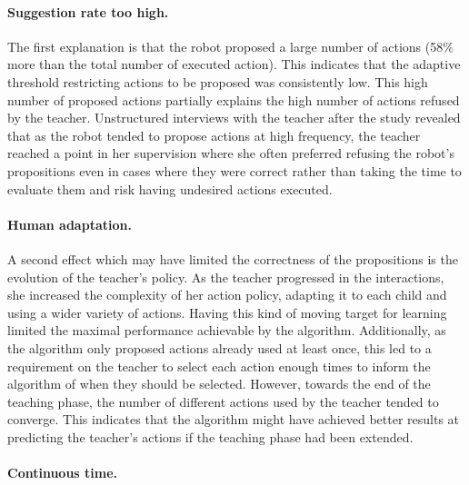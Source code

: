 \paragraph{Suggestion rate too high.}

The first explanation is that the robot proposed a large number of actions (58\% more than the total number of executed action). This indicates that the adaptive threshold restricting actions to be proposed was consistently low. This high number of proposed actions partially explains the high number of actions refused by the teacher. Unstructured interviews with the teacher after the study revealed that as the robot tended to propose actions at high frequency, the teacher reached a point in her supervision where she often preferred refusing the robot's propositions even in cases where they were correct rather than taking the time to evaluate them and risk having undesired actions executed. 

\paragraph{Human adaptation.}

A second effect which may have limited the correctness of the propositions is the evolution of the teacher's policy. As the teacher progressed in the interactions, she increased the complexity of her action policy, adapting it to each child and using a wider variety of actions. Having this kind of moving target for learning limited the maximal performance achievable by the algorithm. Additionally, as the algorithm only proposed actions already used at least once, this led to a requirement on the teacher to select each action enough times to inform the algorithm of when they should be selected. However, towards the end of the teaching phase, the number of different actions used by the teacher tended to converge. This indicates that the algorithm might have achieved better results at predicting the teacher's actions if the teaching phase had been extended.

\paragraph{Continuous time.}


